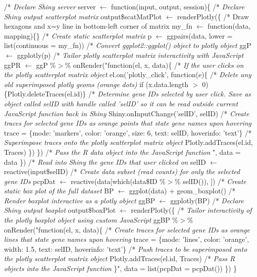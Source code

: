 \documentclass[parskip=full]{bmcart} %
\begin{document}
\begin{backmatter}
\begin{algorithm}[H]
/* \textit{Declare Shiny server}\;
server $\leftarrow$ function(input, output, session)\{\;
\BlankLine
\Indp/* \textit{Declare Shiny output scatterplot matrix}\;
output\$scatMatPlot $\leftarrow$ renderPlotly(\{\;
\BlankLine
\Indp/* Draw hexagons and x=y line in bottom-left corner of matrix\;
my\_fn $\leftarrow$ function(data, mapping)\{\}\;
\BlankLine
/* \textit{Create static scatterplot matrix}\;
p $\leftarrow$ ggpairs(data, lower = list(continuous = my\_fn))\;
\BlankLine
/* \textit{Convert ggplot2::ggplot() object to plotly object}\;
ggP $\leftarrow$ ggplotly(p)\;
\BlankLine
/* \textit{Tailor plotly scatterplot matrix interactivity with JavaScript}\;
ggPR $\leftarrow$ ggP \%$>$\% onRender("function(el, x, data)\{\;
\BlankLine
\Indp/* \textit{If the user clicks on the plotly scatterplot matrix object}\;
el.on('plotly\_click', function(e)\{\;
\BlankLine
\Indp/* \textit{Delete any old superimposed plotly geoms (orange dots)}\;
if (x.data.length $>$ 0)\{Plotly.deleteTraces(el.id)\}\;
\BlankLine
/* \textit{Determine gene IDs selected by user click. Save as object called selID with handle called 'selID' so it can be read outside current JavaScript function back in Shiny}\;
Shiny.onInputChange('selID', selID)\;
\BlankLine
/* \textit{Create traces for selected gene IDs as orange points that state gene names upon hovering}\;
trace = \{mode: 'markers', color: 'orange', size: 6, text: selID, hoverinfo: 'text'\}\;
\BlankLine
/* \textit{Superimpose traces onto the plotly scatterplot matrix object}\;
Plotly.addTraces(el.id, Traces)\;
\Indm\})\;
\Indm\})\;
\BlankLine
/* \textit{Pass the R data object into the JavaScript function}\;
", data = data\;
\Indm\})\;
\BlankLine
/* \textit{Read into Shiny the gene IDs that user clicked on}\;
selID $\leftarrow$ reactive(input\$selID)\;
\BlankLine
/* \textit{Create data subset (read counts) for only the selected gene IDs}\;
pcpDat $\leftarrow$ reactive(data[which(data\$ID \%$>$\% selID()), ])\;
\BlankLine
/* \textit{Create static box plot of the full dataset}\;
BP $\leftarrow$ ggplot(data) $+$ geom\_boxplot()\;
\BlankLine
/* \textit{Render boxplot interactive as a plotly object}\;
ggBP $\leftarrow$ ggplotly(BP)\;
\BlankLine
/* \textit{Declare Shiny output boxplot}\;
output\$boxPlot $\leftarrow$ renderPlotly(\{\;
\BlankLine
\Indp/* \textit{Tailor interactivity of the plotly boxplot object using custom JavaScript}\;
ggBP \%$>$\% onRender("function(el, x, data)\{\;
\BlankLine
\Indp/* \textit{Create traces for selected gene IDs as orange lines that state gene names upon hovering}\;
trace = \{mode: 'lines', color: 'orange', width: 1.5, text: selID, hoverinfo: 'text'\}\;
\BlankLine
/* \textit{Push traces to be superimposed onto the plotly scatterplot matrix object}\;
Plotly.addTraces(el.id, Traces)\;
\BlankLine
\Indm/* \textit{Pass R objects into the JavaScript function}\;
\}", data = list(pcpDat = pcpDat())\;
\Indm\})\;
\Indm\}\;


\end{algorithm}
\end{backmatter}
\end{document}

